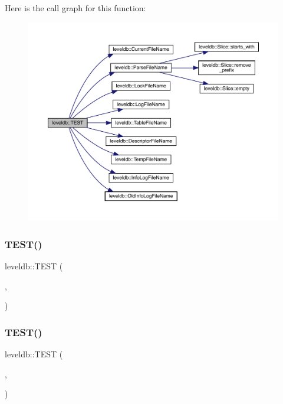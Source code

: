 Here is the call graph for this function\+:
\nopagebreak
\begin{figure}[H]
\begin{center}
\leavevmode
\includegraphics[width=350pt]{namespaceleveldb_ac77b62bf86349926d23431e4c1c9034a_cgraph}
\end{center}
\end{figure}
\mbox{\label{namespaceleveldb_a6ae343add2f7159a8d66341f271a99c2}} 
\subsubsection{\texorpdfstring{TEST()}{TEST()}\hspace{0.1cm}{\footnotesize\ttfamily [13/102]}}
{\footnotesize\ttfamily leveldb\+::\+T\+E\+ST (\begin{DoxyParamCaption}\item[{\mbox{\hyperlink{classleveldb_1_1_find_file_test}{Find\+File\+Test}}}]{,  }\item[{Multiple}]{ }\end{DoxyParamCaption})}

\mbox{\label{namespaceleveldb_a6b1521832d07ed987bc4ea6c3867bd00}} 
\subsubsection{\texorpdfstring{TEST()}{TEST()}\hspace{0.1cm}{\footnotesize\ttfamily [14/102]}}
{\footnotesize\ttfamily leveldb\+::\+T\+E\+ST (\begin{DoxyParamCaption}\item[{\mbox{\hyperlink{classleveldb_1_1_write_batch_test}{Write\+Batch\+Test}}}]{,  }\item[{Append}]{ }\end{DoxyParamCaption})}

